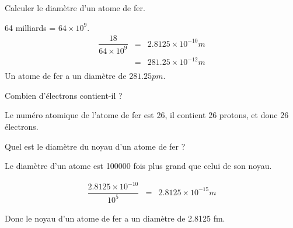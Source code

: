 \begin{questions}
	\question[2] Calculer le diamètre d'un atome de fer.
	\begin{solution}
		64 milliards  = $64 \times 10^9$.
		\begin{eqnarray*}
			\dfrac{18}{64 \times 10^9}& = & \num{2.8125} \times 10^{-10} m \\
			& = & \num{281.25} \times 10^{-12} m \\
		\end{eqnarray*}
	Un atome de fer a un diamètre de $\num{281.25} pm$.
	\end{solution}
	  
	
	\question[1] Combien d'électrons contient-il ?
	\begin{solution}
		Le numéro atomique de l'atome de fer est 26, il contient 26 protons, et donc 26 électrons.
	\end{solution}
	
	\question[1] Quel est le diamètre du noyau d'un atome de fer ?
	\begin{solution}
		Le diamètre d'un atome est \num{100000} fois plus grand que celui de son noyau.
		
		\begin{eqnarray*}
			\dfrac{\num{2.8125} \times 10^{-10}}{10^5}& = & \num{2.8125} \times 10^{-15} m
		\end{eqnarray*}
	
	Donc le noyau d'un atome de fer a un diamètre de \num{2.8125} fm.
	\end{solution}
\end{questions}

